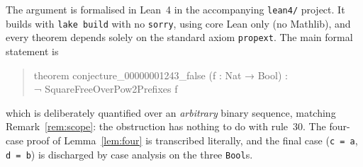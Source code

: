 \documentclass[11pt]{article}
\theoremstyle{definition}
\begin{document}
The argument is formalised in Lean~4 in the accompanying \texttt{lean4/}
project. It builds with \texttt{lake build} with no \texttt{sorry}, using core
Lean only (no Mathlib), and every theorem depends solely on the standard axiom
\texttt{propext}. The main formal statement is

\begin{quote}\ttfamily
theorem conjecture\_00000001243\_false (f : Nat → Bool) :\\
\hspace*{1.5em}¬ SquareFreeOverPow2Prefixes f
\end{quote}

\noindent which is deliberately quantified over an \emph{arbitrary} binary
sequence, matching Remark~\ref{rem:scope}: the obstruction has nothing to do
with rule~30. The four-case proof of Lemma~\ref{lem:four} is transcribed
literally, and the final case (\texttt{c = a}, \texttt{d = b}) is discharged by
case analysis on the three \texttt{Bool}s.
\end{document}
